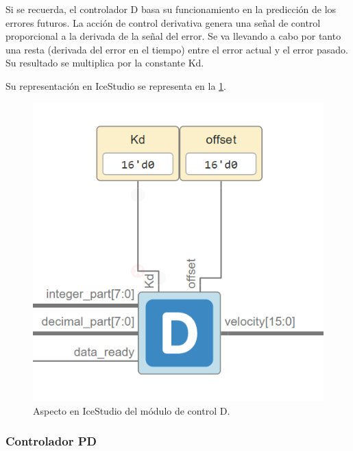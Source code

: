 Si se recuerda, el controlador D basa su funcionamiento en la predicción de los errores futuros. La acción de control derivativa genera una señal de control proporcional a la derivada de la señal del error. \newline
Se va llevando a cabo por tanto una resta (derivada del error en el tiempo) entre el error actual y el error pasado. Su resultado se multiplica por la constante Kd. 

Su representación en IceStudio se representa en la \ref{fig:Dcontrol}.

\begin{figure}[H]
	\center
	\includegraphics[scale=0.5]{imagenes/Balancing_robot/Dcontrol}
	\caption{Aspecto en IceStudio del módulo de control D.}
	\label{fig:Dcontrol}
\end{figure}

\subsubsection{Controlador PD}


